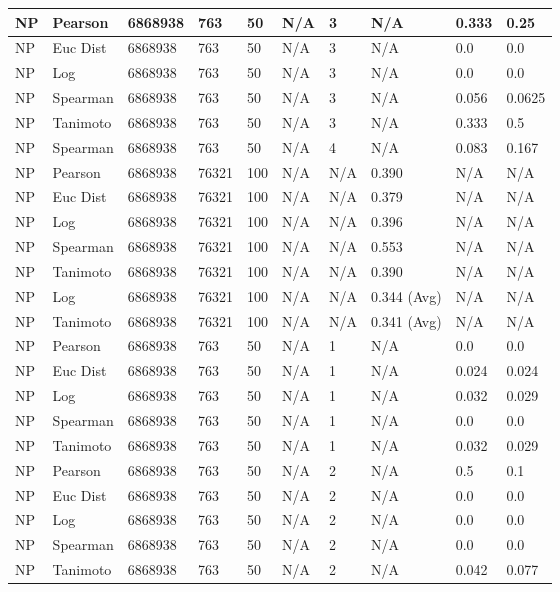 \documentclass{article}
\begin{document}
\begin{longtable}{ |p{1.7cm}|p{1.9cm}|p{1.5cm}|p{1.5cm}|p{0.75cm}|p{0.75cm}|p{0.75cm}|p{0.75cm}|p{1.5cm}|p{1.5cm}|}
    NP & Pearson & 6868938 & 763 & 50&  N/A & 3 & N/A & 0.333 & 0.25  \\ \hline
    NP & Euc Dist & 6868938 & 763 & 50 & N/A & 3  & N/A &0.0 & 0.0   \\ \hline
    NP & Log & 6868938 & 763 & 50 &  N/A & 3  & N/A & 0.0 & 0.0  \\ \hline
    NP & Spearman & 6868938 & 763 & 50 & N/A & 3  & N/A &0.056 & 0.0625 \\ \hline
    NP & Tanimoto & 6868938 & 763 & 50 & N/A & 3 & N/A & 0.333 & 0.5 \\ \hline
    NP & Spearman & 6868938 & 763 & 50 & N/A &  4 & N/A & 0.083 & 0.167 \\ \hline
    
    NP & Pearson & 6868938 & 76321 & 100 &  N/A & N/A & 0.390 & N/A & N/A  \\ \hline
    NP & Euc Dist & 6868938 & 76321 & 100 & N/A & N/A & 0.379 & N/A & N/A   \\ \hline
    NP & Log & 6868938 & 76321 & 100 &  N/A & N/A & 0.396 & N/A & N/A  \\ \hline
    NP & Spearman & 6868938 & 76321 & 100 & N/A & N/A & 0.553 & N/A & N/A \\ \hline
    NP & Tanimoto & 6868938 & 76321 & 100 & N/A & N/A & 0.390 & N/A & N/A \\ \hline
    NP & Log & 6868938 & 76321 & 100 & N/A & N/A & 0.344 (Avg) & N/A & N/A \\ \hline
    NP & Tanimoto & 6868938 & 76321 & 100 & N/A & N/A & 0.341 (Avg) & N/A & N/A \\ \hline
    
    NP & Pearson & 6868938 & 763 & 50 &  N/A & 1 & N/A & 0.0 & 0.0  \\ \hline
    NP & Euc Dist & 6868938 & 763 & 50 & N/A & 1 & N/A &0.024 & 0.024   \\ \hline
    NP & Log & 6868938 & 763 & 50 &  N/A & 1 & N/A & 0.032 & 0.029  \\ \hline
    NP & Spearman & 6868938 & 763 & 50 & N/A & 1 & N/A &0.0 & 0.0 \\ \hline
    NP & Tanimoto & 6868938 & 763 & 50 & N/A & 1 & N/A & 0.032 & 0.029 \\ \hline
    
    NP & Pearson & 6868938 & 763 & 50 &  N/A & 2 & N/A & 0.5 & 0.1  \\ \hline
    NP & Euc Dist & 6868938 & 763 & 50 & N/A &  2 & N/A &0.0 & 0.0   \\ \hline
    NP & Log & 6868938 & 763 & 50 &  N/A &  2 & N/A & 0.0 & 0.0 \\ \hline
    NP & Spearman & 6868938 & 763 & 50 & N/A &  2 & N/A & 0.0 & 0.0 \\ \hline
    NP & Tanimoto & 6868938 & 763 & 50 & N/A &  2 & N/A & 0.042 & 0.077 \\ \hline
    

\end{longtable}
\end{document}
